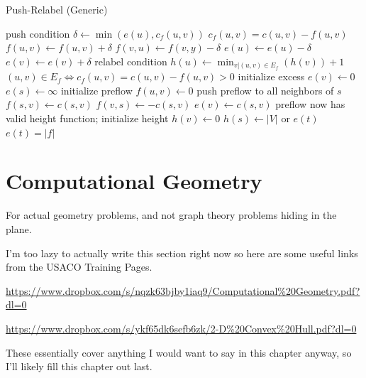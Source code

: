 \documentclass[11pt]{book}
\begin{document}
\begin{algorithm}[H]
\caption{Push-Relabel (Generic)}
\begin{algorithmic}
		\Comment push condition
		\State $\delta \gets \min(e(u), c_f(u,v))$
		\Comment $c_f(u,v) = c(u,v) - f(u,v)$
		\State $f(u,v) \gets f(u,v) + \delta$
		\State $f(v,u) \gets f(v,y) - \delta$
		\State $e(u) \gets e(u) - \delta$
		\State $e(v) \gets e(v) + \delta$
	\EndIf
\EndFunction
{}
		\Comment relabel condition
		\State $h(u) \gets \min_{v | (u,v) \in E_f}(h(v)) + 1$
		\Comment $(u,v) \in E_f \iff c_f(u,v) = c(u,v) - f(u,v) > 0$
	\EndIf
\EndFunction
{}
		\Comment initialize excess
		\State $e(v) \gets 0$
	\EndFor
	\State $e(s) \gets \infty$
		\Comment initialize preflow
		\State $f(u,v) \gets 0$
	\EndFor
		\Comment push preflow to all neighbors of $s$
		\State $f(s,v) \gets c(s,v)$
		\State $f(v,s) \gets -c(s,v)$
		\State $e(v) \gets c(s,v)$
	\EndFor
		\Comment preflow now has valid height function; initialize height
		\State $h(v) \gets 0$
	\EndFor
	\State $h(s) \gets |V|$
		\State {} or 
	\EndWhile
	\State \Return $e(t)$
	\Comment $e(t)=|f|$
\EndFunction
\end{algorithmic}
\end{algorithm}

\chapter{Computational Geometry}

For actual geometry problems, and not graph theory problems hiding in the plane.

I'm too lazy to actually write this section right now so here are some useful links from the USACO Training Pages.

\url{https://www.dropbox.com/s/nqzk63bjby1iaq9/Computational\%20Geometry.pdf?dl=0}

\url{https://www.dropbox.com/s/ykf65dk6sefb6zk/2-D\%20Convex\%20Hull.pdf?dl=0}

These essentially cover anything I would want to say in this chapter anyway, so I'll likely fill this chapter out last.
\end{document}
